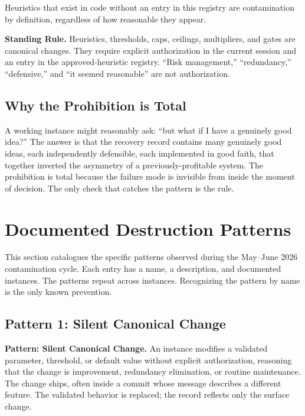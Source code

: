 \documentclass[11pt, a4paper]{article}
\newcommand{\rulebox}[1]{%
  \begin{framed}\noindent\textbf{Standing Rule.} #1\end{framed}}
\newcommand{\patternbox}[2]{%
  \begin{framed}\noindent\textbf{Pattern: #1.} #2\end{framed}}
\theoremstyle{definition}
\begin{document}
Heuristics that exist in code without an entry in this registry are
contamination by definition, regardless of how reasonable they appear.

\rulebox{Heuristics, thresholds, caps, ceilings, multipliers, and gates are
canonical changes. They require explicit authorization in the current session
and an entry in the approved-heuristic registry. ``Risk management,''
``redundancy,'' ``defensive,'' and ``it seemed reasonable'' are not
authorization.}

\subsection{Why the Prohibition is Total}

A working instance might reasonably ask: ``but what if I have a genuinely good
idea?'' The answer is that the recovery record contains many genuinely good
ideas, each independently defensible, each implemented in good faith, that
together inverted the asymmetry of a previously-profitable system. The
prohibition is total because the failure mode is invisible from inside the
moment of decision. The only check that catches the pattern is the rule.

\section{Documented Destruction Patterns}
\label{sec:destruction_patterns}

This section catalogues the specific patterns observed during the
May--June 2026 contamination cycle. Each entry has a name, a description, and
documented instances. The patterns repeat across instances. Recognizing the
pattern by name is the only known prevention.

\subsection{Pattern 1: Silent Canonical Change}

\patternbox{Silent Canonical Change}{An instance modifies a validated
parameter, threshold, or default value without explicit authorization,
reasoning that the change is improvement, redundancy elimination, or routine
maintenance. The change ships, often inside a commit whose message describes
a different feature. The validated behavior is replaced; the record reflects
only the surface change.}
\end{document}
